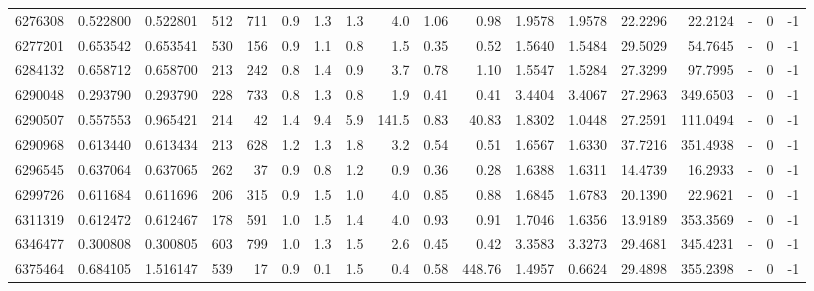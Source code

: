 \begin{tabular}{rrrrrrrrrrrrrrrlrr}
   6276308 & 0.522800 &   0.522801 &  512 &  711 &      0.9 &      1.3 &     1.3 &      4.0 &       1.06 &        0.98 &  1.9578 &  1.9578 &   22.2296 &   22.2124 &             - &        0 &         -1 \\
   6277201 & 0.653542 &   0.653541 &  530 &  156 &      0.9 &      1.1 &     0.8 &      1.5 &       0.35 &        0.52 &  1.5640 &  1.5484 &   29.5029 &   54.7645 &             - &        0 &         -1 \\
   6284132 & 0.658712 &   0.658700 &  213 &  242 &      0.8 &      1.4 &     0.9 &      3.7 &       0.78 &        1.10 &  1.5547 &  1.5284 &   27.3299 &   97.7995 &             - &        0 &         -1 \\
   6290048 & 0.293790 &   0.293790 &  228 &  733 &      0.8 &      1.3 &     0.8 &      1.9 &       0.41 &        0.41 &  3.4404 &  3.4067 &   27.2963 &  349.6503 &             - &        0 &         -1 \\
   6290507 & 0.557553 &   0.965421 &  214 &   42 &      1.4 &      9.4 &     5.9 &    141.5 &       0.83 &       40.83 &  1.8302 &  1.0448 &   27.2591 &  111.0494 &             - &        0 &         -1 \\
   6290968 & 0.613440 &   0.613434 &  213 &  628 &      1.2 &      1.3 &     1.8 &      3.2 &       0.54 &        0.51 &  1.6567 &  1.6330 &   37.7216 &  351.4938 &             - &        0 &         -1 \\
   6296545 & 0.637064 &   0.637065 &  262 &   37 &      0.9 &      0.8 &     1.2 &      0.9 &       0.36 &        0.28 &  1.6388 &  1.6311 &   14.4739 &   16.2933 &             - &        0 &         -1 \\
   6299726 & 0.611684 &   0.611696 &  206 &  315 &      0.9 &      1.5 &     1.0 &      4.0 &       0.85 &        0.88 &  1.6845 &  1.6783 &   20.1390 &   22.9621 &             - &        0 &         -1 \\
   6311319 & 0.612472 &   0.612467 &  178 &  591 &      1.0 &      1.5 &     1.4 &      4.0 &       0.93 &        0.91 &  1.7046 &  1.6356 &   13.9189 &  353.3569 &             - &        0 &         -1 \\
   6346477 & 0.300808 &   0.300805 &  603 &  799 &      1.0 &      1.3 &     1.5 &      2.6 &       0.45 &        0.42 &  3.3583 &  3.3273 &   29.4681 &  345.4231 &             - &        0 &         -1 \\
   6375464 & 0.684105 &   1.516147 &  539 &   17 &      0.9 &      0.1 &     1.5 &      0.4 &       0.58 &      448.76 &  1.4957 &  0.6624 &   29.4898 &  355.2398 &             - &        0 &         -1 \\

\end{tabular}
